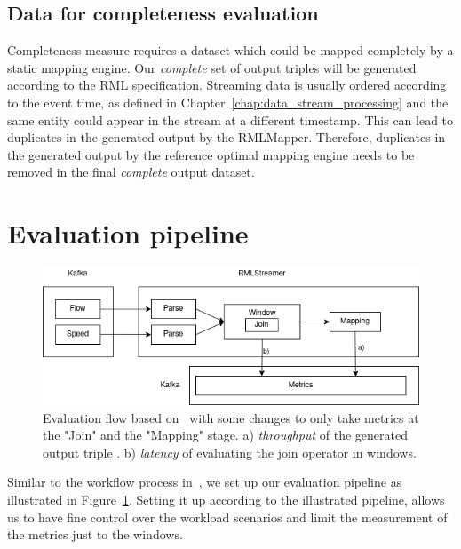 \subsection{Data for completeness evaluation}
Completeness measure requires a dataset which could be mapped completely by a static 
mapping engine. 
Our \emph{complete} set of output triples will be generated according 
to the RML specification. Streaming data is usually 
ordered according to the event time, as defined in Chapter~\ref{chap:data_stream_processing} 
and the same entity could appear in the 
stream at a different timestamp. This can lead to duplicates in the generated output by 
the RMLMapper. Therefore, duplicates in the generated output by the reference optimal
mapping engine needs to be removed in the final \emph{complete} output dataset.

\section{Evaluation pipeline}

\begin{figure}[!htbp]
    \centering
    \includegraphics[width=\textwidth]{fig/evaluation_architecture.png}
    \caption{Evaluation flow based on~\cite{evalution_of_spe} with some changes to only 
    take metrics at the "Join" and the "Mapping" stage. a) \emph{throughput} of the generated output triple . 
    b) \emph{latency} of evaluating the join operator in windows.}
    \label{fig:evaluation_flow}
    
\end{figure}

Similar to the workflow process in~\cite{evalution_of_spe, benchmark_dsp}, we set up
our evaluation pipeline as illustrated in Figure~\ref{fig:evaluation_flow}. Setting it 
up according to the illustrated pipeline, allows us to have fine control over the 
workload scenarios and limit the measurement of the metrics just to the windows. 



